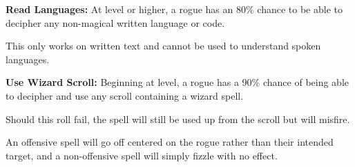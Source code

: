 \begin{multicols*}{2}
\textbf{Read Languages:} At  level or higher, a rogue has an 80\% chance to be able to decipher any non-magical written language or code.

This only works on written text and cannot be used to understand spoken languages.

\textbf{Use Wizard Scroll:} Beginning at  level, a rogue has a 90\% chance of being able to decipher and use any scroll containing a wizard spell.

Should this roll fail, the spell will still be used up from the scroll but will misfire.

An offensive spell will go off centered on the rogue rather than their intended target, and a non-offensive spell will simply fizzle with no effect.


\end{multicols*}
